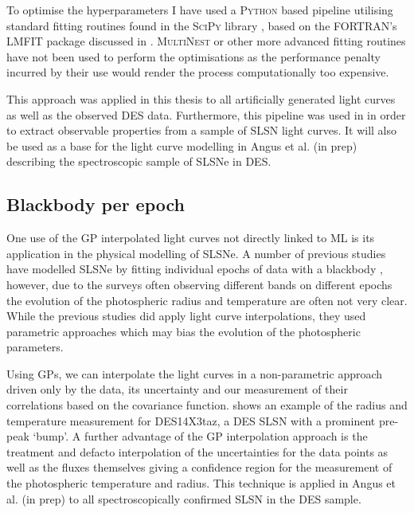 To optimise the hyperparameters I have used a \textsc{Python} based pipeline utilising standard fitting routines found in the \textsc{SciPy} library \citep{Oliphant2007}, based on the \textsc{FORTRAN}'s \textsc{LMFIT} package discussed in . \textsc{MultiNest} or other more advanced fitting routines have not been used to perform the optimisations as the performance penalty incurred by their use would render the process computationally too expensive.

This approach was applied in this thesis to all artificially generated light curves as well as the observed DES data. Furthermore, this pipeline was used in \citet{Inserra2018} in order to extract observable properties from a sample of SLSN light curves. It will also be used as a base for the light curve modelling in Angus et al. (in prep) describing the spectroscopic sample of SLSNe in DES.

\subsection{Blackbody per epoch}
One use of the GP interpolated light curves not directly linked to ML is its application in the physical modelling of SLSNe. A number of previous studies have modelled SLSNe by fitting individual epochs of data with a blackbody \citep{Howell2013,Papadopoulos2015,Smith2016,Nicholl2017}, however, due to the surveys often observing different bands on different epochs the evolution of the photospheric radius and temperature are often not very clear. While the previous studies did apply light curve interpolations, they used parametric approaches which may bias the evolution of the photospheric parameters.

Using GPs, we can interpolate the light curves in a non-parametric approach driven only by the data, its uncertainty and our measurement of their correlations based on the covariance function.  shows an example of the radius and temperature measurement for DES14X3taz, a DES SLSN with a prominent pre-peak `bump'. A further advantage of the GP interpolation approach is the treatment and defacto interpolation of the uncertainties for the data points as well as the fluxes themselves giving a confidence region for the measurement of the photospheric temperature and radius. This technique is applied in Angus et al. (in prep) to all spectroscopically confirmed SLSN in the DES sample.

